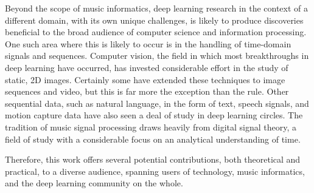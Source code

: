 Beyond the scope of music informatics, deep learning research in the context of a different domain, with its own unique challenges, is likely to produce discoveries beneficial to the broad audience of computer science and information processing.
One such area where this is likely to occur is in the handling of time-domain signals and sequences.
Computer vision, the field in which most breakthroughs in deep learning have occurred, has invested considerable effort in the study of static, 2D images.
Certainly some have extended these techniques to image sequences and video, but this is far more the exception than the rule.
Other sequential data, such as natural language, in the form of text, speech signals, and motion capture data have also seen a deal of study in deep learning circles.
The tradition of music signal processing draws heavily from digital signal theory, a field of study with a considerable focus on an analytical understanding of time.

Therefore, this work offers several potential contributions, both theoretical and practical, to a diverse audience, spanning users of technology, music informatics, and the deep learning community on the whole.


